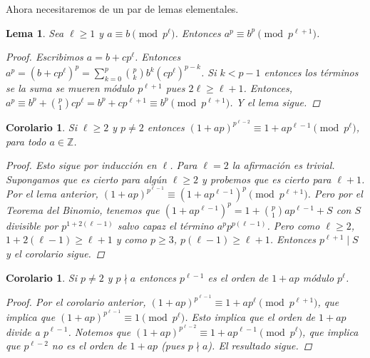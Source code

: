 \documentclass[12pt]{book}
\newtheorem{lem}[teo]{Lema}
\newtheorem{cor}[teo]{Corolario}
\theoremstyle{definition}
\newcommand{\ZZ}{\mathbb{Z}}      %
\begin{document}
Ahora necesitaremos de un par de lemas elementales.

\begin{lem}
Sea $\ell\geq 1$ y $a\equiv b\pmod{p^\ell}$. Entonces $a^p \equiv b^p \pmod{p^{\ell+1}}$. 
\begin{proof}
Escribimos $a=b+cp^\ell$. Entonces $a^p = (b+cp^\ell)^p = \displaystyle\sum_{k=0}^p \binom{p}{k}b^k (cp^\ell)^{p-k}$. Si $k<p-1$ entonces los términos se la suma se mueren módulo $p^{\ell+1}$ pues $2\ell \geq \ell + 1$. Entonces, $a^p \equiv b^p + \displaystyle\binom{p}{1}cp^\ell = b^p + cp^{\ell+1}\equiv b^p \pmod{p^{\ell+1}}$. Y el lema sigue.
\end{proof}
\end{lem}

\begin{cor}
Si $\ell\geq 2$ y $p\neq 2$ entonces $(1+ap)^{p^{\ell-2}}\equiv 1 + ap^{\ell-1}\pmod{p^\ell}$, para todo $a\in\ZZ$.
\begin{proof}
Esto sigue por inducción en $\ell$. Para $\ell=2$ la afirmación es trivial. Supongamos que es cierto para algún $\ell\geq 2$ y probemos que es cierto para $\ell+1$. Por el lema anterior, $(1+ap)^{p^{\ell-1}} \equiv (1+ap^{\ell-1})^p \pmod{p^{\ell+1}}$. Pero por el Teorema del Binomio, tenemos que $(1+ap^{\ell-1})^p = 1 + \displaystyle\binom{p}{1}ap^{\ell-1} + S$ con $S$ divisible por $p^{1+2(\ell-1)}$ salvo capaz el término $a^p p^{p(\ell-1)}$. Pero como $\ell\geq 2$, $1+2(\ell-1)\geq \ell+1$ y como $p\geq 3$, $p(\ell-1)\geq \ell+1$. Entonces $p^{\ell+1}\mid S$ y el corolario sigue.
\end{proof}
\end{cor}

\begin{cor}
Si $p\neq 2$ y $p\nmid a$ entonces $p^{\ell-1}$ es el orden de $1+ap$ módulo $p^\ell$.
\begin{proof}
Por el corolario anterior, $(1+ap)^{p^{\ell-1}}\equiv 1+ap^{\ell}\pmod{p^{\ell+1}}$, que implica que $(1+ap)^{p^{\ell-1}}\equiv 1\pmod{p^{\ell}}$. Esto implica que el orden de $1+ap$ divide a $p^{\ell-1}$. Notemos que $(1+ap)^{p^{\ell-2}}\equiv 1+ap^{\ell-1}\pmod{p^{\ell}}$, que implica que $p^{\ell-2}$ no es el orden de $1+ap$ (pues $p\nmid a$). El resultado sigue.
\end{proof}
\end{cor}
\end{document}
